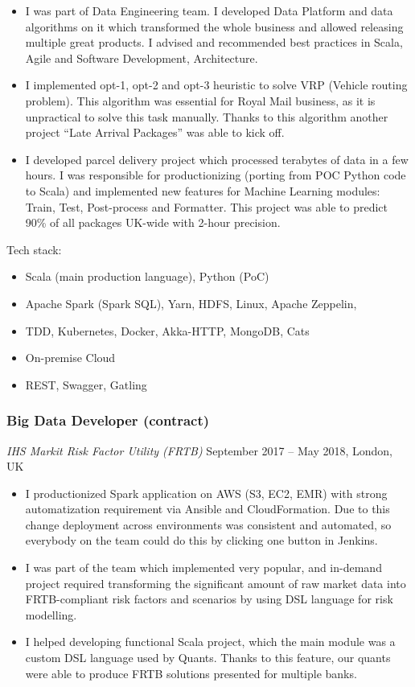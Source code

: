 \documentclass[]{rss}
\providecommand{\tightlist}{%
  \setlength{\itemsep}{0pt}\setlength{\parskip}{0pt}}
\begin{document}
\begin{resume}
\begin{itemize}
\item
  I was part of Data Engineering team. I developed Data Platform and
  data algorithms on it which transformed the whole business and allowed
  releasing multiple great products. I advised and recommended best
  practices in Scala, Agile and Software Development, Architecture.
\item
  I implemented opt-1, opt-2 and opt-3 heuristic to solve VRP (Vehicle
  routing problem). This algorithm was essential for Royal Mail
  business, as it is unpractical to solve this task manually. Thanks to
  this algorithm another project ``Late Arrival Packages'' was able to
  kick off.
\item
  I developed parcel delivery project which processed terabytes of data
  in a few hours. I was responsible for productionizing (porting from
  POC Python code to Scala) and implemented new features for Machine
  Learning modules: Train, Test, Post-process and Formatter. This
  project was able to predict 90\% of all packages UK-wide with 2-hour
  precision.
\end{itemize}

Tech stack:

\begin{itemize}
\tightlist
\item
  Scala (main production language), Python (PoC)
\item
  Apache Spark (Spark SQL), Yarn, HDFS, Linux, Apache Zeppelin,
\item
  TDD, Kubernetes, Docker, Akka-HTTP, MongoDB, Cats
\item
  On-premise Cloud
\item
  REST, Swagger, Gatling
\end{itemize}

\subsubsection{Big Data Developer
(contract)}\label{big-data-developer-contract}

\emph{IHS Markit \textbar{} Risk Factor Utility (FRTB)} September 2017
-- May 2018, London, UK

\begin{itemize}
\item
  I productionized Spark application on AWS (S3, EC2, EMR) with strong
  automatization requirement via Ansible and CloudFormation. Due to this
  change deployment across environments was consistent and automated, so
  everybody on the team could do this by clicking one button in Jenkins.
\item
  I was part of the team which implemented very popular, and in-demand
  project required transforming the significant amount of raw market
  data into FRTB-compliant risk factors and scenarios by using DSL
  language for risk modelling.
\item
  I helped developing functional Scala project, which the main module
  was a custom DSL language used by Quants. Thanks to this feature, our
  quants were able to produce FRTB solutions presented for multiple
  banks.
\end{itemize}


\end{resume}
\end{document}
